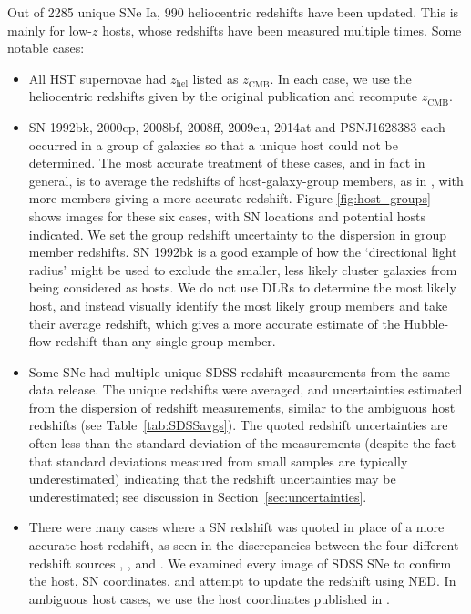 \documentclass[
  journal=pasa,
  manuscript=research-paper,
  year=2022,
]{cup-journal}
\newcommand{\zCMB}[1]{\ensuremath{z_{\text{CMB}}^{\mathrm{#1}}}}
\newcommand\zhel{\ensuremath{z_{\text{hel}}}}
\begin{document}
Out of 2285 unique SNe Ia, 990 heliocentric redshifts have been updated.
This is mainly for low-$z$ hosts, whose redshifts have been measured multiple times.
Some notable cases:
\begin{itemize}
    \item All HST supernovae had \zhel{} listed as \zCMB{}.  In each case, we use the heliocentric redshifts given by the original publication and recompute \zCMB{}.
    \item SN 1992bk, 2000cp, 2008bf, 2008ff, 2009eu, 2014at and PSNJ1628383 each occurred in a group of galaxies so that a unique host could not be determined. The most accurate treatment of these cases, and in fact in general, is to average the redshifts of host-galaxy-group members, as in \citet{Peterson2021}, with more members giving a more accurate redshift. 
    Figure \ref{fig:host_groups} shows images for these six cases, with SN locations and potential hosts indicated. 
    We set the group redshift uncertainty to the dispersion in group member redshifts. 
    SN 1992bk is a good example of how the `directional light radius' \citep[DLR; see][]{Gupta2016} might be used to exclude the smaller, less likely cluster galaxies from being considered as hosts. We do not use DLRs to determine the most likely host, and instead visually identify the most likely group members and take their average redshift, which gives a more accurate estimate of the Hubble-flow redshift than any single group member. 
    \item Some SNe had multiple unique SDSS redshift measurements from the same data release. The unique redshifts were averaged, and uncertainties estimated from the dispersion of redshift measurements, similar to the ambiguous host redshifts (see Table~\ref{tab:SDSSavgs}). The quoted redshift uncertainties are often less than the standard deviation of the measurements (despite the fact that standard deviations measured from small samples are typically underestimated) indicating that the redshift uncertainties may be underestimated; see discussion in Section~\ref{sec:uncertainties}. 
    \item 
    There were many cases where a SN redshift was quoted in place of a more accurate host redshift, as seen in the discrepancies between the four different redshift sources \citet[][Table 1 and Table 9]{Sako2018}, \citet{Gupta2011}, and \citet{Ostman2011}.
    We examined every image of SDSS SNe to confirm the host, SN coordinates, and attempt to update the redshift using NED.
    In ambiguous host cases, we use the host coordinates published in \citet{Sako2018}. 

\end{itemize}
\end{document}
